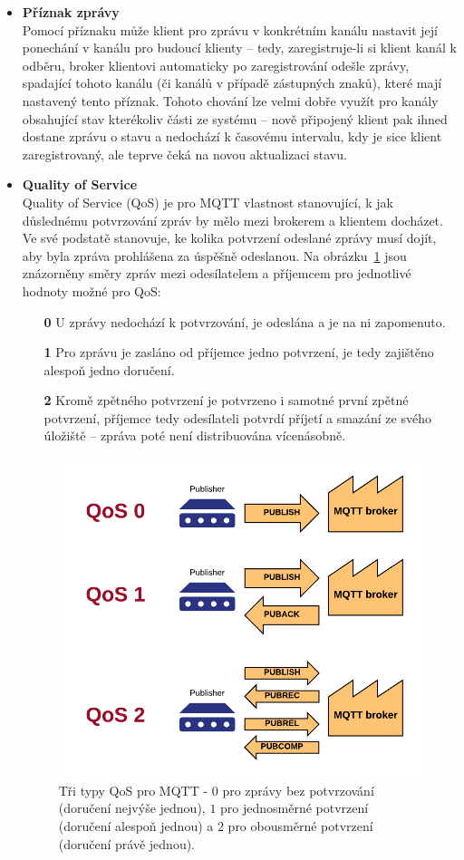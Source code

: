 \begin{itemize}
    \item \textbf{Příznak zprávy } \\
    Pomocí příznaku  může klient pro zprávu v konkrétním kanálu nastavit její ponechání v kanálu pro budoucí klienty
    -- tedy, zaregistruje-li si klient kanál k odběru, broker klientovi automaticky po zaregistrování odešle zprávy,
    spadající tohoto kanálu (či kanálů v případě zástupných znaků), které mají nastavený tento příznak.
    Tohoto chování lze velmi dobře využít pro kanály obsahující stav kterékoliv části ze systému --
    nově připojený klient pak ihned dostane zprávu o stavu a nedochází k časovému intervalu, kdy je sice klient
    zaregistrovaný, ale teprve čeká na novou aktualizaci stavu.

    \item \textbf{Quality of Service} \\
    Quality of Service (QoS) je pro MQTT vlastnost stanovující, k jak důslednému potvrzování zpráv by mělo mezi
    brokerem a klientem docházet.
    Ve své podstatě stanovuje, ke kolika potvrzení odeslané zprávy musí dojít, aby byla
    zpráva prohlášena za úspěšně odeslanou. Na obrázku~\ref{fig:mqtt-qos} jsou znázorněny směry zpráv mezi
    odesílatelem a příjemcem pro jednotlivé hodnoty možné pro QoS:

    \begin{enumerate}
        \item[\textbf{0}] U zprávy nedochází k potvrzování, je odeslána a je na ni zapomenuto.
        \item[\textbf{1}] Pro zprávu je zasláno od příjemce jedno potvrzení, je tedy zajištěno alespoň jedno doručení.
        \item[\textbf{2}] Kromě zpětného potvrzení je potvrzeno i samotné první zpětné potvrzení, příjemce tedy
        odesílateli potvrdí příjetí a smazání ze svého úložiště -- zpráva poté není distribuována vícenásobně.
    \end{enumerate}

    \begin{figure}
        \centering
        \includegraphics[width=.5\textwidth]{figures/mqtt-qos.png}
        \caption{Tři typy QoS pro MQTT - $0$ pro zprávy bez potvrzování (doručení nejvýše jednou), $1$ pro jednosměrné potvrzení (doručení alespoň jednou) a $2$ pro obousměrné potvrzení (doručení právě jednou).}
        \label{fig:mqtt-qos}
    \end{figure}

\end{itemize}

